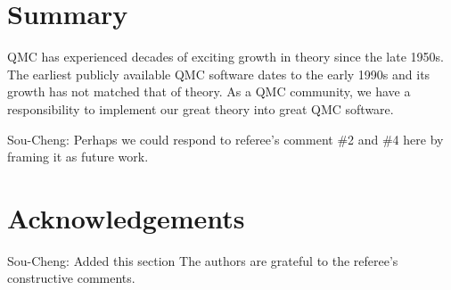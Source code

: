 \documentclass[graybox]{svmult}
\newcommand{\SCComment}[1]{{\color{green} Sou-Cheng: #1}}
\begin{document}
\section{Summary}
QMC has experienced decades of exciting growth in theory since the late 1950s.  The earliest publicly available QMC software dates to the early 1990s and its growth has not matched that of theory.  As a QMC community, we have a responsibility to implement our great theory into great QMC software.

\SCComment{Perhaps we could respond to referee's comment \#2 and \#4 here by framing it as future work.}

\section*{Acknowledgements}\SCComment{Added this section}
The authors are grateful to the referee's constructive comments. 




\end{document}
